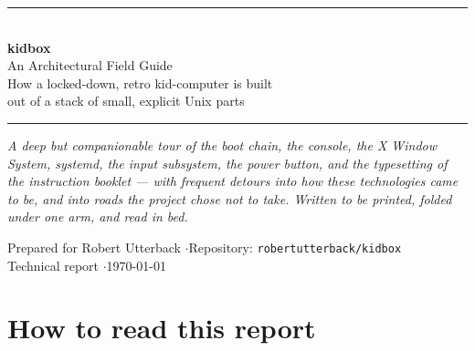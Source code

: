 \documentclass[11pt,oneside]{article}
\begin{document}
\begin{titlepage}
\thispagestyle{empty}
\begin{center}
\vspace*{1.2cm}
{\color{rulegrey}\rule{\textwidth}{1.2pt}}\\[1.0em]
{\sffamily\bfseries\Huge\color{kbblue} kidbox}\\[0.45em]
{\sffamily\LARGE\color{ink} An Architectural Field Guide}\\[0.8em]
{\sffamily\large\color{kbgrey} How a locked-down, retro kid-computer is built\\
out of a stack of small, explicit Unix parts}\\[0.9em]
{\color{rulegrey}\rule{\textwidth}{1.2pt}}
\end{center}

\vfill

\begin{center}
\begin{minipage}{0.86\textwidth}
\small\itshape\color{kbgrey}
A deep but companionable tour of the boot chain, the console, the X Window
System, systemd, the input subsystem, the power button, and the typesetting
of the instruction booklet --- with frequent detours into how these
technologies came to be, and into roads the project chose \emph{not} to take.
Written to be printed, folded under one arm, and read in bed.
\end{minipage}
\end{center}

\vfill

\begin{center}
\small\sffamily\color{kbgrey}
Prepared for Robert Utterback \quad$\cdot$\quad Repository: \texttt{robertutterback/kidbox}\\[0.3em]
Technical report \quad$\cdot$\quad \today
\end{center}
\end{titlepage}

\tableofcontents
\thispagestyle{empty}
\clearpage

\section{How to read this report}
\end{document}
